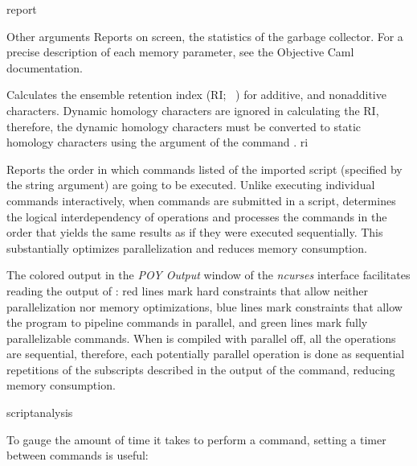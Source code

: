 \begin{command}{report}{}
\begin{arguments}
\begin{argumentgroup}{Other arguments}
                {Reports on screen, the statistics of
                the garbage collector. For a precise description of each memory parameter, see
                the Objective Caml documentation.}
                {}
     
                {Calculates the ensemble retention index (RI; ~\cite{farris1989}) for additive, and
                nonadditive characters. Dynamic homology characters are ignored in calculating
                the RI, therefore, the dynamic homology characters must be converted
                to static homology characters using the argument  
                of the command .}
                {ri}
      
                {Reports the order in which commands listed of the imported
                script (specified by the string argument) are going to be executed.
                Unlike executing individual commands interactively, when commands are submitted in a 
                script, \poy determines the logical interdependency of operations
                and processes the commands in the order that yields the same
                results as if they were executed sequentially. This substantially
                optimizes parallelization and reduces memory consumption.
            
                The colored output in the \emph{POY Output} window of the \emph{ncurses}
                interface facilitates reading the output of :
                red lines mark hard constraints that allow neither
                parallelization nor memory optimizations, blue lines mark 
                constraints that allow the program to pipeline commands in
                parallel, and green lines mark fully parallelizable commands. When \poy
                is compiled with parallel off, all the operations are
                sequential, therefore, each potentially parallel operation is
                done as sequential repetitions of the subscripts described in
                the output of the command, reducing memory consumption.}
                {scriptanalysis}
            
            \begin{statement}
                To gauge the amount of time it takes \poy to perform a command, 
                setting a timer between commands is useful:
                \begin{flushleft}
                    \\
                    \\
                    \\
                    \\
                \end{flushleft}


\end{statement}
\end{argumentgroup}
\end{arguments}
\end{command}

